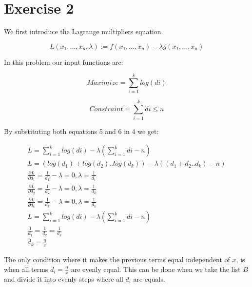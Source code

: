 \documentclass{article}
\begin{document}
\section*{Exercise 2} %

We first introduce the Lagrange multipliers equation. 

\begin{equation}
	L(x_1, …, x_n, \lambda) := f(x_1, …, x_n) - \lambda  g(x_1, …, x_n)
\end{equation}

In this problem our input functions are: 

\begin{equation}
	Maximize = \sum_{i=1}^{k} log(di)
\end{equation}

\begin{equation}
	Constraint = \sum_{i=1}^{k}di \leq n
\end{equation}

By substituting both equations 5 and 6 in 4 we get: 
\begin{flushleft}
\begin{equation}
	\begin{aligned}
	 L = \sum_{i=1}^{k} log(di) - \lambda (\sum_{i=1}^{k}di - n) \\
	 L = (log(d_1) + log(d_2) .. log(d_k)) - \lambda ((d_1 + d_2 .. d_k) - n) \\ 
	 \frac{\partial L}{\partial d_1} = \frac{1}{d_1} - \lambda = 0, \lambda = \frac{1}{d_1} \\
	 \frac{\partial L}{\partial d_2} = \frac{1}{d_2} - \lambda = 0, \lambda = \frac{1}{d_2} \\
	 \frac{\partial L}{\partial d_k} = \frac{1}{d_k} - \lambda = 0, \lambda = \frac{1}{d_k} \\
	 L = \sum_{i=1}^{k} log(di) - \lambda (\sum_{i=1}^{k}di - n) \\
	\frac{1}{d_1} = \frac{1}{d_2} = \frac{1}{d_k} \\
	d_k = \frac{n}{x}
	\end{aligned}
\end{equation}
\end{flushleft}
\begin{flushleft}
The only condition where it makes the previous terms equal independent of $x$, is when all terms  $d_i = \frac{n}{x}$ are evenly equal. This can be done when we take the list $B$ and divide it into evenly steps where all $d_i$ are equals. 
\end{flushleft}
\end{document}
